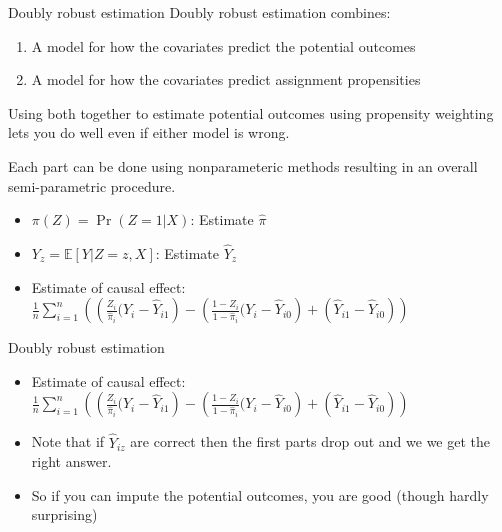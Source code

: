 \documentclass[
  11pt,
  ignorenonframetext,
]{beamer}
\providecommand{\tightlist}{%
  \setlength{\itemsep}{0pt}\setlength{\parskip}{0pt}}\usepackage{longtable,booktabs,array}
\begin{document}
\begin{frame}{Doubly robust estimation}
\protect\hypertarget{doubly-robust-estimation-1}{}
Doubly robust estimation combines:

\begin{enumerate}
\tightlist
\item
  A model for how the covariates predict the potential outcomes
\item
  A model for how the covariates predict assignment propensities
\end{enumerate}

Using both together to estimate potential outcomes using propensity
weighting lets you do well even if either model is wrong.

Each part can be done using nonparameteric methods resulting in an
overall semi-parametric procedure.

\begin{itemize}
\tightlist
\item
  \(\pi(Z) = \Pr(Z=1|X)\): Estimate \(\hat\pi\)
\item
  \(Y_z = \mathbb{E}[Y|Z=z, X]\): Estimate \(\hat{Y}_z\)
\item
  Estimate of causal effect:
  \(\frac{1}{n}\sum_{i=1}^n\left(\left(\frac{Z_i}{\hat{\pi}_i}(Y_i - \hat{Y}_{i1}\right) - \left(\frac{1-Z_i}{1-\hat{\pi}_i}(Y_i - \hat{Y}_{i0}\right) + \left(\hat{Y}_{i1} - \hat{Y}_{i0}\right) \right)\)
\end{itemize}
\end{frame}

\begin{frame}{Doubly robust estimation}
\protect\hypertarget{doubly-robust-estimation-2}{}
\begin{itemize}
\item
  Estimate of causal effect:
  \(\frac{1}{n}\sum_{i=1}^n\left(\left(\frac{Z_i}{\hat{\pi}_i}(Y_i - \hat{Y}_{i1}\right) - \left(\frac{1-Z_i}{1-\hat{\pi}_i}(Y_i - \hat{Y}_{i0}\right) + \left(\hat{Y}_{i1} - \hat{Y}_{i0}\right) \right)\)
\item
  Note that if \(\hat{Y}_{iz}\) are correct then the first parts drop
  out and we we get the right answer.
\item
  So if you can impute the potential outcomes, you are good (though
  hardly surprising)
\end{itemize}
\end{frame}
\end{document}
